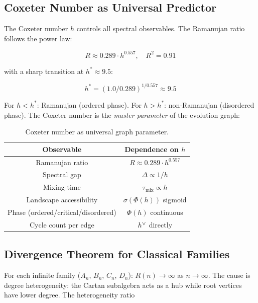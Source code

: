 \subsection{Coxeter Number as Universal Predictor}\label{sec:coxeter_predictor}

The Coxeter number $h$ controls all spectral observables. The Ramanujan ratio follows the power law:

\begin{equation}
R \approx 0.289 \cdot h^{0.557}, \quad R^2 = 0.91
\end{equation}

with a sharp transition at $h^* \approx 9.5$:

\begin{equation}
h^* = (1.0 / 0.289)^{1/0.557} \approx 9.5
\end{equation}

For $h < h^*$: Ramanujan (ordered phase). For $h > h^*$: non-Ramanujan (disordered phase). The Coxeter number is the \emph{master parameter} of the evolution graph:

\begin{table}[h]
\centering
\begin{tabular}{c c}
\hline\hline
Observable & Dependence on $h$ \\
\hline
Ramanujan ratio & $R \approx 0.289 \cdot h^{0.557}$ \\
Spectral gap & $\Delta \propto 1/h$ \\
Mixing time & $\tau_{\mathrm{mix}} \propto h$ \\
Landscape accessibility & $\sigma(\Phi(h))$ sigmoid \\
Phase (ordered/critical/disordered) & $\Phi(h)$ continuous \\
Cycle count per edge & $h^\vee$ directly \\
\hline\hline
\end{tabular}
\caption{Coxeter number as universal graph parameter.}
\end{table}

\subsection{Divergence Theorem for Classical Families}\label{sec:divergence_theorem}

For each infinite family ($A_n$, $B_n$, $C_n$, $D_n$): $R(n) \to \infty$ as $n \to \infty$. The cause is degree heterogeneity: the Cartan subalgebra acts as a hub while root vertices have lower degree. The heterogeneity ratio


